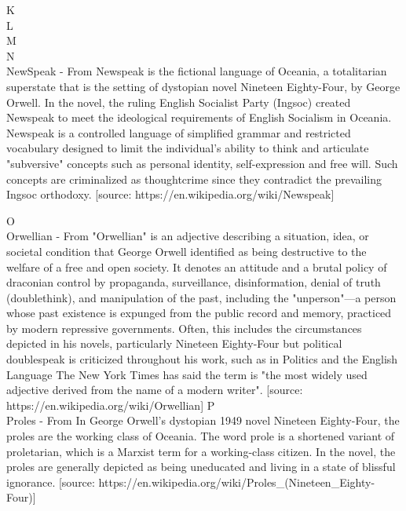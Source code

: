 \documentclass{article} %
\begin{document}
{  K \\
  
  L \\
  
  M \\
  
  N \\
  
  NewSpeak - From \NineteenEightyFour{} Newspeak is the fictional language of Oceania, a totalitarian superstate that is the setting of dystopian novel Nineteen Eighty-Four, by George Orwell. In the novel, the ruling English Socialist Party (Ingsoc) created Newspeak to meet the ideological requirements of English Socialism in Oceania. Newspeak is a controlled language of simplified grammar and restricted vocabulary designed to limit the individual's ability to think and articulate "subversive" concepts such as personal identity, self-expression and free will. Such concepts are criminalized as thoughtcrime since they contradict the prevailing Ingsoc orthodoxy. [source: https://en.wikipedia.org/wiki/Newspeak]

  O \\
  Orwellian - From \NineteenEightyFour{} "Orwellian" is an adjective describing a situation, idea, or societal condition that George Orwell identified as being destructive to the welfare of a free and open society. It denotes an attitude and a brutal policy of draconian control by propaganda, surveillance, disinformation, denial of truth (doublethink), and manipulation of the past, including the "unperson"—a person whose past existence is expunged from the public record and memory, practiced by modern repressive governments. Often, this includes the circumstances depicted in his novels, particularly Nineteen Eighty-Four but political doublespeak is criticized throughout his work, such as in Politics and the English Language \n The New York Times has said the term is "the most widely used adjective derived from the name of a modern writer". [source: https://en.wikipedia.org/wiki/Orwellian]
  P \\
  
  Proles - From \NineteenEightyFour{} In George Orwell's dystopian 1949 novel Nineteen Eighty-Four, the proles are the working class of Oceania. The word prole is a shortened variant of proletarian, which is a Marxist term for a working-class citizen. In the novel, the proles are generally depicted as being uneducated and living in a state of blissful ignorance. [source: https://en.wikipedia.org/wiki/Proles_(Nineteen_Eighty-Four)]
  
}
\end{document}
